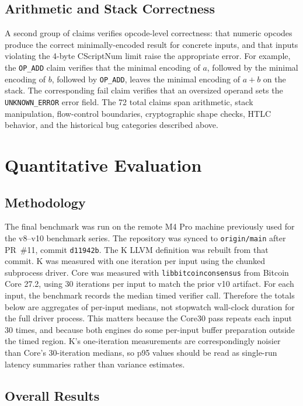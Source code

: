 \documentclass[conference]{IEEEtran}
\begin{document}
\subsection{Arithmetic and Stack Correctness}

A second group of claims verifies opcode-level correctness: that numeric
opcodes produce the correct minimally-encoded result for concrete inputs, and
that inputs violating the 4-byte CScriptNum limit raise the appropriate error.
For example, the \texttt{OP\_ADD} claim verifies that the minimal encoding of
$a$, followed by the minimal encoding of $b$, followed by \texttt{OP\_ADD},
leaves the minimal encoding of $a+b$ on the stack.  The corresponding fail
claim verifies that an oversized operand sets the \texttt{UNKNOWN\_ERROR} error
field.  The 72 total claims span arithmetic, stack manipulation, flow-control
boundaries, cryptographic shape checks, HTLC behavior, and the historical bug
categories described above.

\section{Quantitative Evaluation}

\subsection{Methodology}

The final benchmark was run on the remote M4 Pro machine previously used for
the v8--v10 benchmark series.  The repository was synced to
\texttt{origin/main} after PR~\#11, commit \texttt{d11942b}.  The K LLVM definition was
rebuilt from that commit.  K was measured with one iteration per input using
the chunked subprocess driver.  Core was measured with
\texttt{libbitcoinconsensus} from Bitcoin Core 27.2, using 30 iterations per
input to match the prior v10 artifact.  For each input, the benchmark records
the median timed verifier call.  Therefore the totals below are aggregates of
per-input medians, not stopwatch wall-clock duration for the full driver
process.  This matters because the Core30 pass repeats each input 30 times, and
because both engines do some per-input buffer preparation outside the timed
region.  K's one-iteration measurements are correspondingly noisier than Core's
30-iteration medians, so p95 values should be read as single-run latency
summaries rather than variance estimates.

\subsection{Overall Results}
\end{document}
